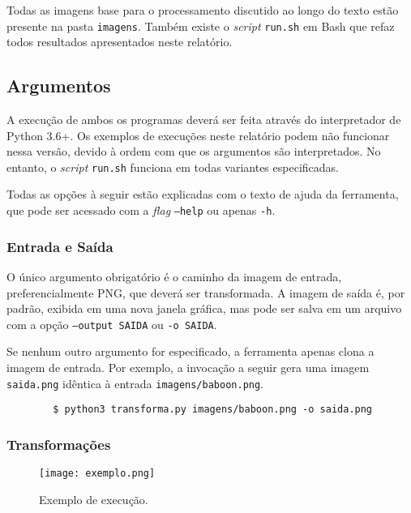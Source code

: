     Todas as imagens base para o processamento discutido ao longo do texto estão presente na pasta \texttt{imagens}. Também existe o \textit{script} \texttt{run.sh} em Bash que refaz todos resultados apresentados neste relatório.

\subsection{Argumentos}

    A execução de ambos os programas deverá ser feita através do interpretador de Python 3.6+. Os exemplos de execuções neste relatório podem não funcionar nessa versão, devido à ordem com que os argumentos são interpretados. No entanto, o \textit{script} \texttt{run.sh} funciona em todas variantes especificadas.

    Todas as opções à seguir estão explicadas com o texto de ajuda da ferramenta, que pode ser acessado com a \textit{flag} \texttt{--help} ou apenas \texttt{-h}.

\subsubsection{Entrada e Saída}

    O único argumento obrigatório é o caminho da imagem de entrada, preferencialmente PNG, que deverá ser transformada. A imagem de saída é, por padrão, exibida em uma nova janela gráfica, mas pode ser salva em um arquivo com a opção \texttt{--output SAIDA} ou \texttt{-o SAIDA}.

    Se nenhum outro argumento for especificado, a ferramenta apenas clona a imagem de entrada. Por exemplo, a invocação a seguir gera uma imagem \texttt{saida.png} idêntica à entrada \texttt{imagens/baboon.png}.

    \begin{verbatim}
        $ python3 transforma.py imagens/baboon.png -o saida.png
    \end{verbatim}

\subsubsection{Transformações}

    \begin{wrapfigure}{L}{0.25\textwidth}
        \centering
        \texttt{[image: exemplo.png]}
        \caption{Exemplo de execução.}
        \label{fig:exemplo}
    \end{wrapfigure}

